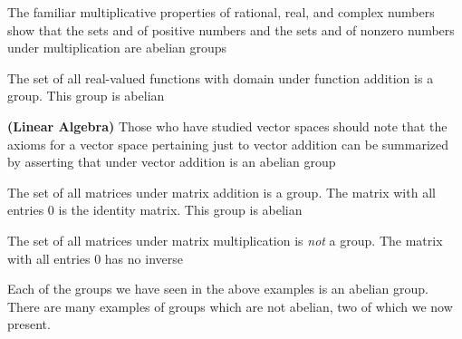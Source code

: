 \documentclass[11pt,oneside]{article}
\begin{document}
\begin{BookBody}

 The familiar multiplicative properties of rational, real, and complex numbers show that the sets  and  of positive numbers and the sets  and  of nonzero numbers under multiplication are abelian groups\BookEnd{\blacktriangle}

 The set of all real-valued functions with domain  under function addition is a group. This group is abelian\BookEnd{\blacktriangle}

 \textbf{(Linear Algebra)} Those who have studied vector spaces should note that the axioms for a vector space  pertaining just to vector addition can be summarized by asserting that  under vector addition is an abelian group\BookEnd{\blacktriangle}

 The set  of all  matrices under matrix addition is a group. The  matrix with all entries 0 is the identity matrix. This group is abelian\BookEnd{\blacktriangle}

 The set  of all  matrices under matrix multiplication is\textit{ not} a group. The  matrix with all entries 0 has no inverse\BookEnd{\blacktriangle}

Each of the groups we have seen in the above examples is an abelian group. There are many examples of groups which are not abelian, two of which we now present.


\end{BookBody}
\end{document}
